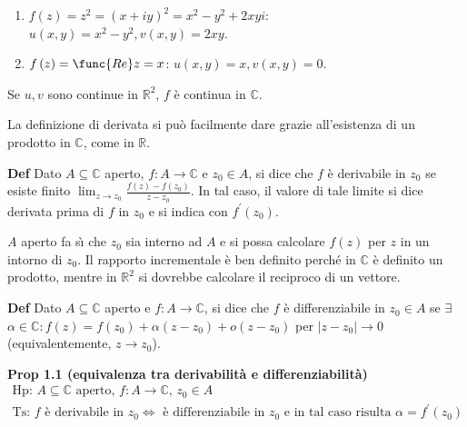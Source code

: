 \documentclass{article}
\begin{document}
\begin{enumerate}
\item $f\left( z\right) =z^{2}=\left( x+iy\right) ^{2}=x^{2}-y^{2}+2xyi$: $%
u\left( x,y\right) =x^{2}-y^{2},v\left( x,y\right) =2xy$.

\item $f\left( z\right) =\func{Re}z=x$: $u\left( x,y\right) =x,v\left(
x,y\right) =0$.
\end{enumerate}

Se $u,v$ sono continue in $%
\mathbb{R}
^{2}$, $f$ \`{e} continua in $%
\mathbb{C}
$.

La definizione di derivata si pu\`{o} facilmente dare grazie all'esistenza
di un prodotto in $%
\mathbb{C}
$, come in $%
\mathbb{R}
$.

\textbf{Def }Dato $A\subseteq 
\mathbb{C}
$ aperto, $f:A\rightarrow 
\mathbb{C}
$ e $z_{0}\in A$, si dice che $f$ \`{e} derivabile in $z_{0}$ se esiste
finito $\lim_{z\rightarrow z_{0}}\frac{f\left( z\right) -f\left(
z_{0}\right) }{z-z_{0}}$. In tal caso, il valore di tale limite si dice
derivata prima di $f$ in $z_{0}$ e si indica con $f^{\prime }\left(
z_{0}\right) $.

$A$ aperto fa s\`{\i} che $z_{0}$ sia interno ad $A$ e si possa calcolare $%
f\left( z\right) $ per $z$ in un intorno di $z_{0}$. Il rapporto
incrementale \`{e} ben definito perch\'{e} in $%
\mathbb{C}
$ \`{e} definito un prodotto, mentre in $%
\mathbb{R}
^{2}$ si dovrebbe calcolare il reciproco di un vettore.

\textbf{Def }Dato $A\subseteq 
\mathbb{C}
$ aperto e $f:A\rightarrow 
\mathbb{C}
$, si dice che $f$ \`{e} differenziabile in $z_{0}\in A$ se $\exists $ $%
\alpha \in 
\mathbb{C}
:f\left( z\right) =f\left( z_{0}\right) +\alpha \left( z-z_{0}\right)
+o\left( z-z_{0}\right) $ per $\left\vert z-z_{0}\right\vert \rightarrow 0$
(equivalentemente, $z\rightarrow z_{0}$).

\textbf{Prop 1.1 (equivalenza tra derivabilit\`{a} e differenziabilit\`{a})}%
\begin{gather*}
\text{Hp: }A\subseteq 
\mathbb{C}
\text{ aperto, }f:A\rightarrow 
\mathbb{C}
\text{, }z_{0}\in A \\
\text{Ts: }f\text{ \`{e} derivabile in }z_{0}\Longleftrightarrow \text{ \`{e}
differenziabile in }z_{0}\text{ e in tal caso risulta }\alpha =f^{\prime
}\left( z_{0}\right)
\end{gather*}
\end{document}
